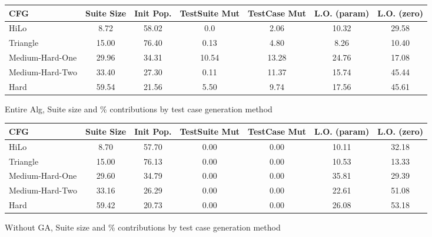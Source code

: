 \documentclass[runningheads]{llncs}
\begin{document}
\begin{figure}[h!]
	\begin{center}
		\begin{tabular}{| l | c || c | c | c | c | c |}
			\hline
			CFG             & Suite Size & Init Pop. & TestSuite Mut & TestCase Mut & L.O. (param)  & L.O. (zero) \\ \hline
			HiLo            & 8.72  & 58.02 & 0.0   & 2.06  & 10.32  & 29.58	\\ \hline
			Triangle        & 15.00  & 76.40 & 0.13  & 4.80  & 8.26  & 10.40 \\ \hline
			Medium-Hard-One & 29.96 & 34.31 & 10.54 & 13.28 & 24.76 & 17.08 \\ \hline
			Medium-Hard-Two & 33.40 & 27.30 & 0.11  & 11.37 & 15.74 & 45.44 \\ \hline
			Hard            & 59.54 & 21.56 & 5.50  & 9.74 & 17.56 & 45.61 \\ \hline
		\end{tabular}
	\end{center}
	\caption{Entire Alg, Suite size and \% contributions by test case generation method}
	\label{fig:finalResultEntireAlgContrib}
\end{figure}

\begin{figure}[h!]
	\begin{center}
		\begin{tabular}{| l | c || c | c | c | c | c |}
			\hline
			CFG             & Suite Size & Init Pop. & TestSuite Mut & TestCase Mut & L.O. (param)  & L.O. (zero) \\ \hline
			HiLo            & 8.70 & 57.70 & 0.00   & 0.00  & 10.11  & 32.18	\\ \hline
			Triangle        & 15.00  & 76.13  & 0.00   & 0.00  & 10.53  & 13.33 \\ \hline
			Medium-Hard-One &  29.60  & 34.79 & 0.00  & 0.00  & 35.81  & 29.39 \\ \hline
			Medium-Hard-Two & 33.16 & 26.29 & 0.00  & 0.00 & 22.61 & 51.08 \\ \hline
			Hard            & 59.42 & 20.73 & 0.00  & 0.00 & 26.08 & 53.18 \\ \hline
		\end{tabular}
	\end{center}
	\caption{Without GA, Suite size and \% contributions by test case generation method} 
	\label{fig:finalResultNoGAContrib}
\end{figure}
\end{document}
